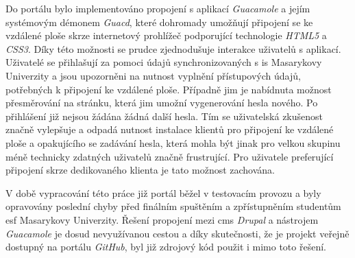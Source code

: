 Do portálu bylo implementováno propojení s aplikací \emph{Guacamole} a jejím systémovým démonem \emph{Guacd}, které dohromady umožňují připojení se ke vzdálené ploše skrze internetový prohlížeč podporující technologie \emph{HTML5} a \emph{CSS3}. Díky této možnosti se prudce zjednodušuje interakce uživatelů s aplikací. Uživatelé se přihlašují za pomoci údajů synchronizovaných s \gls{is} Masarykovy Univerzity a jsou upozorněni na nutnost vyplnění přístupových údajů, potřebných k připojení ke vzdálené ploše. Případně jim je nabídnuta možnost přesměrování na stránku, která jim umožní vygenerování hesla nového. Po přihlášení již nejsou žádána žádná další hesla. Tím se uživatelská zkušenost značně vylepšuje a odpadá nutnost instalace klientů pro připojení ke vzdálené ploše a opakujícího se zadávání hesla, která mohla být jinak pro velkou skupinu méně technicky zdatných uživatelů značně frustrující. Pro uživatele preferující připojení skrze dedikovaného klienta je tato možnost zachována.

V době vypracování této práce již portál běžel v testovacím provozu a byly opravovány poslední chyby před finálním spuštěním a zpřístupněním studentům \gls{esf} Masarykovy Univerzity. Řešení propojení mezi \gls{cms} \emph{Drupal} a nástrojem \emph{Guacamole} je dosud nevyužívanou cestou a díky skutečnosti, že je projekt veřejně dostupný na portálu \emph{GitHub}, byl již zdrojový kód použit i mimo toto řešení.
